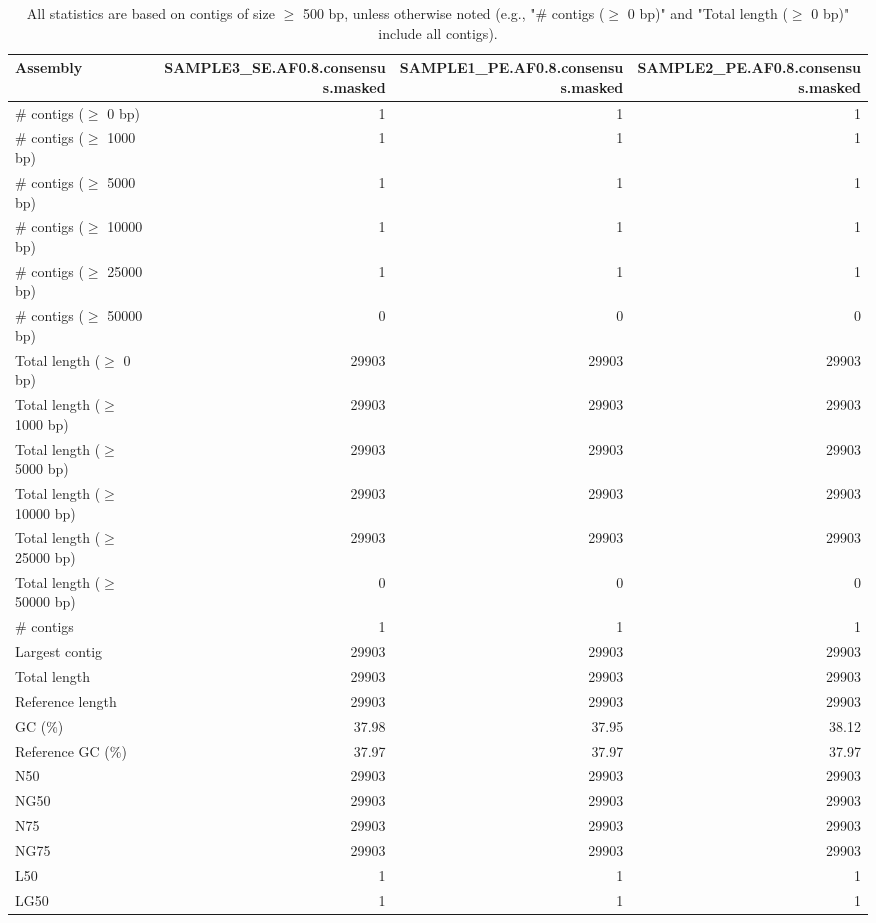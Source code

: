 \documentclass[12pt,a4paper]{article}
\begin{document}
\begin{table}[ht]
\begin{center}
\caption{All statistics are based on contigs of size $\geq$ 500 bp, unless otherwise noted (e.g., "\# contigs ($\geq$ 0 bp)" and "Total length ($\geq$ 0 bp)" include all contigs).}
\begin{tabular}{|l*{3}{|r}|}
\hline
Assembly & SAMPLE3\_SE.AF0.8.consensus.masked & SAMPLE1\_PE.AF0.8.consensus.masked & SAMPLE2\_PE.AF0.8.consensus.masked \\ \hline
\# contigs ($\geq$ 0 bp) & 1 & 1 & 1 \\ \hline
\# contigs ($\geq$ 1000 bp) & 1 & 1 & 1 \\ \hline
\# contigs ($\geq$ 5000 bp) & 1 & 1 & 1 \\ \hline
\# contigs ($\geq$ 10000 bp) & 1 & 1 & 1 \\ \hline
\# contigs ($\geq$ 25000 bp) & 1 & 1 & 1 \\ \hline
\# contigs ($\geq$ 50000 bp) & 0 & 0 & 0 \\ \hline
Total length ($\geq$ 0 bp) & 29903 & 29903 & 29903 \\ \hline
Total length ($\geq$ 1000 bp) & 29903 & 29903 & 29903 \\ \hline
Total length ($\geq$ 5000 bp) & 29903 & 29903 & 29903 \\ \hline
Total length ($\geq$ 10000 bp) & 29903 & 29903 & 29903 \\ \hline
Total length ($\geq$ 25000 bp) & 29903 & 29903 & 29903 \\ \hline
Total length ($\geq$ 50000 bp) & 0 & 0 & 0 \\ \hline
\# contigs & 1 & 1 & 1 \\ \hline
Largest contig & 29903 & 29903 & 29903 \\ \hline
Total length & 29903 & 29903 & 29903 \\ \hline
Reference length & 29903 & 29903 & 29903 \\ \hline
GC (\%) & 37.98 & 37.95 & 38.12 \\ \hline
Reference GC (\%) & 37.97 & 37.97 & 37.97 \\ \hline
N50 & 29903 & 29903 & 29903 \\ \hline
NG50 & 29903 & 29903 & 29903 \\ \hline
N75 & 29903 & 29903 & 29903 \\ \hline
NG75 & 29903 & 29903 & 29903 \\ \hline
L50 & 1 & 1 & 1 \\ \hline
LG50 & 1 & 1 & 1 \\ \hline

\end{tabular}
\end{center}
\end{table}
\end{document}
